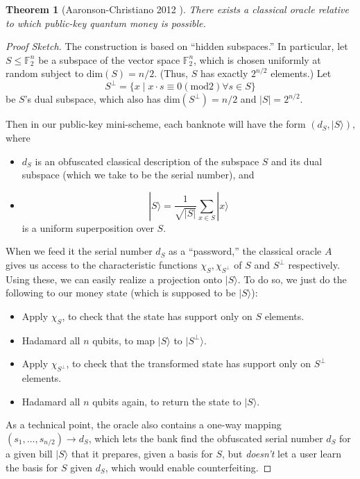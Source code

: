 \documentclass[12pt]{report}
\theoremstyle{plain}
\newtheorem{theorem}{Theorem}[section]
\theoremstyle{definition}
\renewcommand{\ket}[1]{|#1\rangle}
\begin{document}
\begin{theorem}[Aaronson-Christiano 2012 \cite{achristiano}] There exists a classical oracle relative to which public-key quantum money is possible.
\label{acthm}
\end{theorem}
\begin{proof}[Proof Sketch] The construction is based on ``hidden subspaces.''  In particular, let $S\leq \mathbb F_2^n$ be a subspace of the vector space $\mathbb F_2^n$, which is chosen uniformly at random subject to $\text{dim}(S) = n/2$.  (Thus, $S$ has exactly $2^{n/2}$ elements.)  Let
$$S^\perp = \{ x \;|\; x\cdot s\equiv 0 \left(\mathrm{mod }2\right) \forall s\in S\}$$
be $S$'s dual subspace, which also has $\text{dim}(S^\perp) = n/2$ and $\left|S\right| = 2^{n/2}$.

Then in our public-key mini-scheme, each banknote will have the form $(d_S, \ket S)$, where
\begin{itemize}
\item $d_S$ is an obfuscated classical description of the subspace $S$ and its dual subspace (which we take to be the serial number), and
\item $$\ket S =\frac {1}{\sqrt{|S|}}\sum_{x\in S} \ket{x}$$ is a uniform superposition over $S$.
\end{itemize}
When we feed it the serial number $d_S$ as a ``password,'' the classical oracle $A$ gives us access to the characteristic functions $\chi_S, \chi_{S^\perp}$ of $S$ and $S^\perp$ respectively.  Using these, we can easily realize a projection onto $\ket{S}$.  To do so, we just do the following to our money state (which is supposed to be $\ket{S}$):
\begin{itemize}
\item Apply $\chi_S$, to check that the state has support only on $S$ elements.
\item Hadamard all $n$ qubits, to map $\ket S$ to $\ket{S^\perp}$.
\item Apply $\chi_{S^\perp}$, to check that the transformed state has support only on $S^\perp$ elements.
\item Hadamard all $n$ qubits again, to return the state to $\ket S$.
\end{itemize}

As a technical point, the oracle also contains a one-way mapping $(s_1,\ldots,s_{n/2})\rightarrow d_S$, which lets the bank find the obfuscated serial number $d_S$ for a given bill $\ket S$ that it prepares, given a basis for $S$, but {\em doesn't} let a user learn the basis for $S$ given $d_S$, which would enable counterfeiting.


\end{proof}
\end{document}
